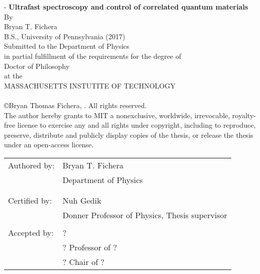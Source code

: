 \begin{titlingpage}
\calccentering{\unitlength}
\begin{adjustwidth*}{\unitlength}{-\unitlength}
\centering
{\Large\bfseries Ultrafast spectroscopy and control of correlated quantum materials}\\[0.5\baselineskip]
{By}\\[0.5\baselineskip]
{\large Bryan T. Fichera\\[0.5\baselineskip]}
{B.S., University of Pennsylvania (2017)\\[0.5\baselineskip]
Submitted to the Department of Physics\\ in partial fulfillment of the requirements for the degree of\\[0.5\baselineskip]
{\large Doctor of Philosophy\\[0.5\baselineskip]}
at the\\[0.5\baselineskip]
{\large MASSACHUSETTS INSTUTITE OF TECHNOLOGY\\[0.5\baselineskip]}
\\[0.5\baselineskip]}
\copyright Bryan Thomas Fichera, . All rights reserved.\\[0.5\baselineskip]
The author hereby grants to MIT a nonexclusive, worldwide, irrevocable, royalty-free license to exercise any and all rights under copyright, including to reproduce, preserve, distribute and publicly display copies of the thesis, or release the thesis under an open-access license.\\[2\baselineskip]
\flushleft
\begin{tabularx}{\textwidth}{ll}
Authored by: & Bryan T. Fichera\\
& Department of Physics\\
& \\
\\
Certified by: & Nuh Gedik\\
& Donner Professor of Physics, Thesis supervisor\\
\\
Accepted by: & ?\\
& ? Professor of ?\\
& ? Chair of ?
\end{tabularx}
\end{adjustwidth*}
\end{titlingpage}
